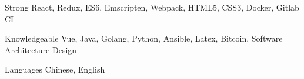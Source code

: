 

\begin{cvskills}

  \cvskill
    {Strong} %
    {React, Redux, ES6, Emscripten, Webpack, HTML5, CSS3, Docker, Gitlab CI} %

  \cvskill
    {Knowledgeable} %
    {Vue, Java, Golang, Python, Ansible, Latex, Bitcoin, Software Architecture Design} %

  \cvskill
    {Languages} %
    {Chinese, English} %

\end{cvskills}
